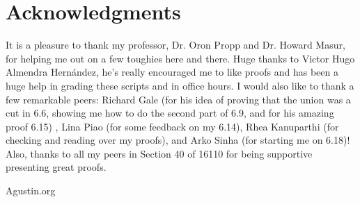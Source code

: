 \documentclass[openany, amssymb, psamsfonts]{amsart}
\theoremstyle{definition}
\numberwithin{equation}{section}
\begin{document}
\section*{Acknowledgments} It is a pleasure to thank my professor, Dr. Oron Propp and Dr. Howard Masur, for helping me out on a few toughies here and there. Huge thanks to Victor Hugo Almendra Hernández, he's really encouraged me to like proofs and has been a huge help in grading these scripts and in office hours. I would also like to thank a few remarkable peers: Richard Gale (for his idea of proving that the union was a cut in 6.6, showing me how to do the second part of 6.9, and for his amazing proof 6.15) , Lina Piao (for some feedback on my 6.14), Rhea Kanuparthi (for checking and reading over my proofs), and Arko Sinha (for starting me on 6.18)! Also, thanks to all my peers in Section 40 of 16110 for being supportive presenting great proofs. 

\begin{thebibliography}{9}

 Agustin.org


\end{thebibliography}
\end{document}
